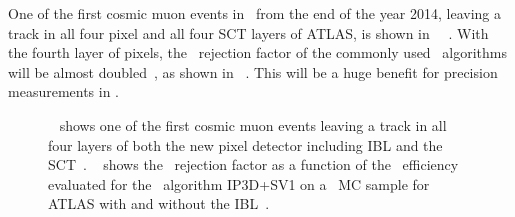 %
One of the first cosmic muon events in \RunTwo\ from the end of the year 2014, leaving a track in all four pixel and all four \gls{SCT} layers of \gls{ATLAS}, is shown in \fig~~\cite{ATLASRun2EventDisplays}. 
%
With the fourth layer of pixels, the \ljet\ rejection factor of the commonly used \btag\ algorithms will be almost doubled~\cite{IBL-TDR}, as shown in \fig~. This will be a huge benefit for precision measurements in \RunTwo. 
%
\begin{figure}[tbp!]
\centering
{}
\hfill
{}
\caption[Performance of the upgraded pixel detector]{
%
\Fig~ shows one of the first cosmic muon events leaving a track in all four layers of both the new pixel detector including \gls{IBL} and the \gls{SCT}~\cite{ATLASRun2EventDisplays}. 
%
\Fig~ shows the \ljet\ rejection factor as a function of the \btag\ efficiency evaluated for the \btag\ algorithm IP3D+SV1 on a \ttbar\ \gls{MC} sample for \gls{ATLAS} with and without the \gls{IBL}~\cite{IBL-TDR}. 
}
\label{fig:IBLsuccess}
\end{figure}







